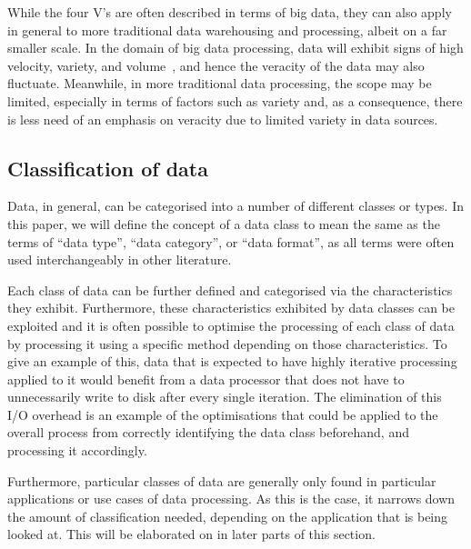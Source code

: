 \documentclass[a4paper,11pt]{article}
\begin{document}
While the four V's are often described in terms of big data, they can also apply in general to more traditional data
warehousing and processing, albeit on a far smaller scale. In the domain of big data processing, data will
exhibit signs of high velocity, variety, and volume~\cite{beyer2011gartner}, and hence the veracity of the data may also fluctuate. Meanwhile,
in more traditional data processing, the scope may be limited, especially in terms of factors such as variety and, as a
consequence, there is less need of an emphasis on veracity due to limited variety in data sources.


\subsection{Classification of data} %
\label{sub:data_classification}

Data, in general, can be categorised into a number of different classes or types. In this paper, we will define the
concept of a data class to mean the same as the terms of ``data type'', ``data category'', or ``data format'', as all terms were often
used interchangeably in other literature.

Each class of data can be further defined and categorised via the characteristics they exhibit. Furthermore, these
characteristics exhibited by data classes can be exploited and it is often possible to optimise the processing of each
class of data by processing it using a specific method depending on those characteristics.%
To give an example of this, data that is expected to have highly iterative
processing applied to it would benefit from a data processor that does not have to unnecessarily write to disk after
every single iteration. The elimination of this I/O overhead is an example of the optimisations that could be applied to
the overall process from correctly identifying the data class beforehand, and processing it accordingly.

Furthermore, particular classes of data are generally only found in particular applications or use cases of data
processing.%
As this is the case, it narrows down the amount of classification needed, depending on the application that
is being looked at. This will be elaborated on in later parts of this section.
\end{document}
